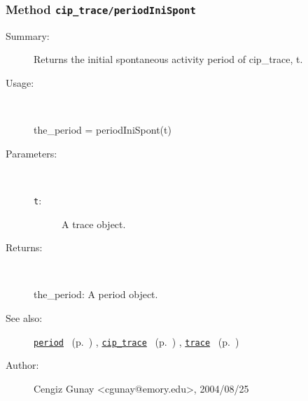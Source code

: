 \subsubsection[Method \texttt{periodIniSpont}]{Method \texttt{cip\_trace/periodIniSpont}}%
%
\label{ref_cip_trace__periodIniSpont}%
\hypertarget{ref_cip_trace__periodIniSpont}{}%
\begin{description}
\item[Summary:]Returns the initial spontaneous activity period of 
		cip\_trace, t. 
%
\item[Usage:]~%
\begin{lyxcode}%
the\_period = periodIniSpont(t)
%
\end{lyxcode}%
%
%
\item[Parameters:]~
\begin{description}%
\item[\texttt{t}:]
 A trace object.
\end{description}%
%
\item[Returns:]~

	the\_period: A period object.
%
%
\item[See also:]%
\hyperlink{ref_period}{\texttt{period}}%
\ (p.~\pageref{ref_period})%
%
, \hyperlink{ref_cip_trace}{\texttt{cip\_trace}}%
\ (p.~\pageref{ref_cip_trace})%
%
, \hyperlink{ref_trace}{\texttt{trace}}%
\ (p.~\pageref{ref_trace})%
%
%
\item[Author:]%
Cengiz Gunay <cgunay@emory.edu>, 2004/08/25%
\end{description}
\methodline%
